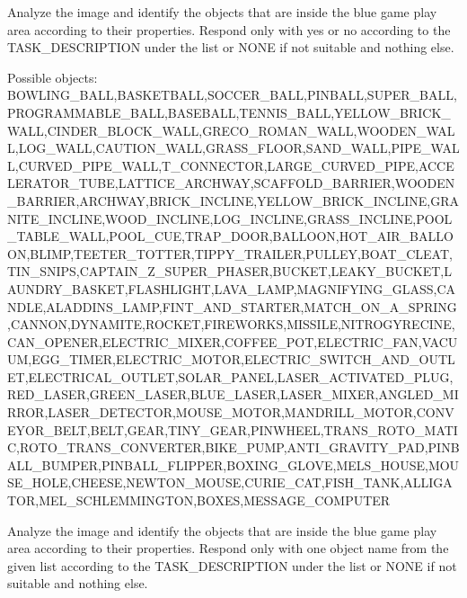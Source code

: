 

Analyze the image and identify the objects that are inside the blue game play area according to their properties.
Respond only with yes or no according to the TASK_DESCRIPTION under the list or NONE if not suitable and nothing else.

Possible objects:
BOWLING_BALL,BASKETBALL,SOCCER_BALL,PINBALL,SUPER_BALL,PROGRAMMABLE_BALL,BASEBALL,TENNIS_BALL,YELLOW_BRICK_WALL,CINDER_BLOCK_WALL,GRECO_ROMAN_WALL,WOODEN_WALL,LOG_WALL,CAUTION_WALL,GRASS_FLOOR,SAND_WALL,PIPE_WALL,CURVED_PIPE_WALL,T_CONNECTOR,LARGE_CURVED_PIPE,ACCELERATOR_TUBE,LATTICE_ARCHWAY,SCAFFOLD_BARRIER,WOODEN_BARRIER,ARCHWAY,BRICK_INCLINE,YELLOW_BRICK_INCLINE,GRANITE_INCLINE,WOOD_INCLINE,LOG_INCLINE,GRASS_INCLINE,POOL_TABLE_WALL,POOL_CUE,TRAP_DOOR,BALLOON,HOT_AIR_BALLOON,BLIMP,TEETER_TOTTER,TIPPY_TRAILER,PULLEY,BOAT_CLEAT,TIN_SNIPS,CAPTAIN_Z_SUPER_PHASER,BUCKET,LEAKY_BUCKET,LAUNDRY_BASKET,FLASHLIGHT,LAVA_LAMP,MAGNIFYING_GLASS,CANDLE,ALADDINS_LAMP,FINT_AND_STARTER,MATCH_ON_A_SPRING,CANNON,DYNAMITE,ROCKET,FIREWORKS,MISSILE,NITROGYRECINE,CAN_OPENER,ELECTRIC_MIXER,COFFEE_POT,ELECTRIC_FAN,VACUUM,EGG_TIMER,ELECTRIC_MOTOR,ELECTRIC_SWITCH_AND_OUTLET,ELECTRICAL_OUTLET,SOLAR_PANEL,LASER_ACTIVATED_PLUG,RED_LASER,GREEN_LASER,BLUE_LASER,LASER_MIXER,ANGLED_MIRROR,LASER_DETECTOR,MOUSE_MOTOR,MANDRILL_MOTOR,CONVEYOR_BELT,BELT,GEAR,TINY_GEAR,PINWHEEL,TRANS_ROTO_MATIC,ROTO_TRANS_CONVERTER,BIKE_PUMP,ANTI_GRAVITY_PAD,PINBALL_BUMPER,PINBALL_FLIPPER,BOXING_GLOVE,MELS_HOUSE,MOUSE_HOLE,CHEESE,NEWTON_MOUSE,CURIE_CAT,FISH_TANK,ALLIGATOR,MEL_SCHLEMMINGTON,BOXES,MESSAGE_COMPUTER


Analyze the image and identify the objects that are inside the blue game play area according to their properties.
Respond only with one object name from the given list according to the TASK_DESCRIPTION under the list or NONE if not suitable and nothing else.

